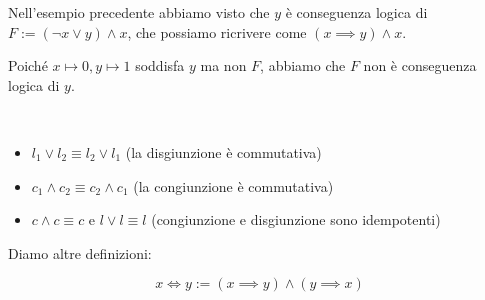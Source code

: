 \documentclass[10pt,a4paper,twoside]{book}
\begin{document}
\begin{example}
    Nell'esempio precedente abbiamo visto che $y$ è conseguenza logica di $F:= (\neg x \lor y) \land x $, che possiamo ricrivere come $(x \implies y) \land x$.

    Poiché $x \mapsto 0, y \mapsto 1$ soddisfa $y$ ma non $F$, abbiamo che $F$ non è conseguenza logica di $y$.
\end{example}
\begin{example}\
    \begin{itemize}
        \item $l_1 \lor l_2 \equiv l_2 \lor l_1$ (la disgiunzione è commutativa)
        \item $c_1 \land c_2 \equiv c_2 \land c_1$ (la congiunzione è commutativa)
        \item $c \land c \equiv c$ e $l \lor l \equiv l$ (congiunzione e disgiunzione sono idempotenti)
    \end{itemize}
\end{example}
Diamo altre definizioni:
\begin{definition}
    \begin{equation*}
        x \iff y := (x \implies y)\land(y \implies x)
    \end{equation*}
\end{definition}
\end{document}
